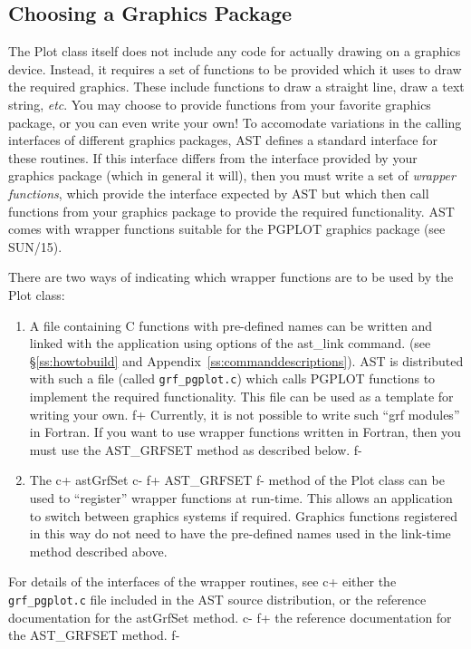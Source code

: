 \documentclass[twoside,11pt]{article}
\newcommand{\xref}[3]{#1}
\newcommand{\appref}[1]{Appendix~\ref{#1}}
\newcommand{\secref}[1]{\S\ref{#1}}
\newcommand{\appref}[1]{\ref{#1}}
\newcommand{\secref}[1]{\ref{#1}}
\begin{document}
\subsection{\label{ss:choosingagraphicspackage}Choosing a Graphics Package}
The Plot class itself does not include any code for actually drawing on a
graphics device. Instead, it requires a set of functions to be provided
which it uses to draw the required graphics. These include functions
to draw a straight line, draw a text string, \emph{etc}. You may choose
to provide functions from your favorite graphics package, or you can even
write your own! To accomodate variations in the calling interfaces of
different graphics packages, AST defines a standard interface for these
routines. If this interface differs from the interface provided by your
graphics package (which in general it will), then you must write a set of
\emph{wrapper functions}, which provide the interface expected by AST but
which then call functions from your graphics package to provide the
required functionality. AST comes with wrapper functions suitable for
the PGPLOT graphics package (see \xref{SUN/15}{sun15}{}).

There are two ways of indicating which wrapper functions are to be used by 
the Plot class:
\begin{enumerate}

\item A file containing C functions with pre-defined names can be written
and linked with the application using options of the ast\_link command.
(see \secref{ss:howtobuild} and \appref{ss:commanddescriptions}). AST is
distributed with such a file (called {\tt grf\_pgplot.c}) which calls PGPLOT 
functions to implement the required functionality. This file can be used
as a template for writing your own.
f+
Currently, it is not possible to write such ``grf modules'' in Fortran.
If you want to use wrapper functions written in Fortran, then you must 
use the AST\_GRFSET method as described below.
f-

\item The 
c+
astGrfSet 
c-
f+
AST\_GRFSET
f-
method of the Plot class can be used to ``register''
wrapper functions at run-time. This allows an application to switch
between graphics systems if required. Graphics functions registered in
this way do not need to have the pre-defined names used in the link-time
method described above.

\end{enumerate}

For details of the interfaces of the wrapper routines, see 
c+
either the {\tt grf\_pgplot.c} file included in the AST source
distribution, or the reference documentation for the astGrfSet method.
c-
f+
the reference documentation for the AST\_GRFSET method.
f-
\end{document}
